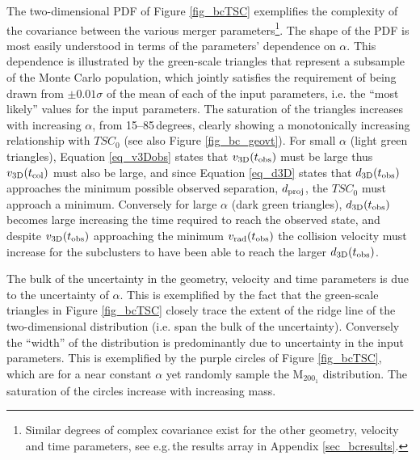 \documentclass[12pt]{emulateapj}
\begin{document}
The two-dimensional PDF of Figure \ref{fig_bcTSC} exemplifies the complexity of the covariance between the various merger parameters\footnote{Similar degrees of complex covariance exist for the other geometry, velocity and time parameters, see e.g.\,the results array in Appendix \ref{sec_bcresults}.}.
The shape of the PDF is most easily understood in terms of the parameters' dependence on $\alpha$.
This dependence is illustrated by the green-scale triangles that represent a subsample of the Monte Carlo population,  which jointly satisfies the requirement of being drawn from $\pm 0.01 \sigma$ of the mean of each of the input parameters, i.e. the ``most likely'' values for the input parameters.
The saturation of the triangles increases with increasing $\alpha$, from 15--85\,degrees, clearly showing a monotonically increasing relationship with $TSC_0$ (see also Figure \ref{fig_bc_geovt}).
For small $\alpha$ (light green triangles), Equation \ref{eq_v3Dobs} states that $v_{\rm 3D}(t_{\rm obs})$ must be large thus $v_{\rm 3D}(t_{\rm col})$ must also be large, and since Equation \ref{eq_d3D} states that $d_{\rm 3D}(t_{\rm obs})$ approaches the minimum possible observed separation, $d_{\rm proj}$, the $TSC_0$ must approach a minimum.
Conversely for large $\alpha$ (dark green triangles), $d_{\rm 3D}(t_{\rm obs})$ becomes large increasing the time required to reach the observed state, and despite $v_{\rm 3D}(t_{\rm obs})$ approaching the minimum $v_{\rm rad}(t_{\rm obs})$ the collision velocity must increase for the subclusters to have been able to reach the larger $d_{\rm 3D}(t_{\rm obs})$.   

The bulk of the uncertainty in the geometry, velocity and time parameters is due to the uncertainty of $\alpha$.
This is exemplified by the fact that the green-scale triangles in Figure \ref{fig_bcTSC} closely trace the extent of the ridge line of the two-dimensional distribution (i.e. span the bulk of the uncertainty).
Conversely the ``width'' of the distribution is predominantly due to uncertainty in the input parameters.
This is exemplified by the purple circles of Figure \ref{fig_bcTSC}, which are for a near constant $\alpha$ yet randomly sample the M$_{200_1}$ distribution. 
The saturation of the circles increase with increasing mass.
\end{document}
